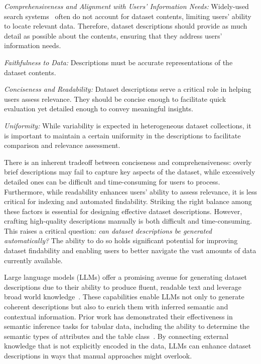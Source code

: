 \noindent \emph{Comprehensiveness and Alignment with Users' Information Needs:}
  Widely-used search systems~\cite{CKAN,socrata,brickley2019google} often do not account for dataset contents, limiting users' ability to locate relevant data. Therefore, dataset descriptions should provide as much detail as possible about the contents, ensuring that they address users' information needs.

\noindent \emph{Faithfulness to Data:} Descriptions must be accurate representations of the dataset contents.

\noindent \emph{Conciseness and Readability:}
 Dataset descriptions serve a critical role in helping users assess relevance. They should be concise enough to facilitate quick evaluation yet detailed enough to convey meaningful insights. 

\noindent \emph{Uniformity:} While  variability is expected in heterogeneous dataset collections, it is important to maintain a certain uniformity in the descriptions to facilitate comparison and relevance assessment.

There is an inherent tradeoff between conciseness and comprehensiveness: overly brief descriptions may fail to capture key aspects of the dataset, while excessively detailed ones can be difficult and time-consuming for users to process. Furthermore, while readability enhances users’ ability to assess relevance, it is less critical for indexing and automated findability. Striking the right balance among these factors is essential for designing effective dataset descriptions.
% 
However, crafting high-quality descriptions manually is both difficult and time-consuming. 
% 
This raises a critical question: \textit{can dataset descriptions be generated automatically?} The ability to do so holds significant potential for improving dataset findability and enabling users to better navigate the vast amounts of data currently available.

%
Large language models (LLMs) offer a promising avenue for generating dataset descriptions due to their ability to produce fluent, readable text and leverage broad world knowledge~\cite{brown2020gpt,touvron2023llama}. These capabilities enable LLMs not only to generate coherent descriptions but also to enrich them with inferred semantic and  contextual information. Prior work has demonstrated their effectiveness in semantic inference tasks for tabular data, including the ability to determine the semantic types of attributes and the table class~\cite{archetype@vldb2024,chorus@vldb2024}. By connecting external knowledge that is not explicitly encoded in the data, LLMs can enhance dataset descriptions in ways that manual approaches might overlook.

